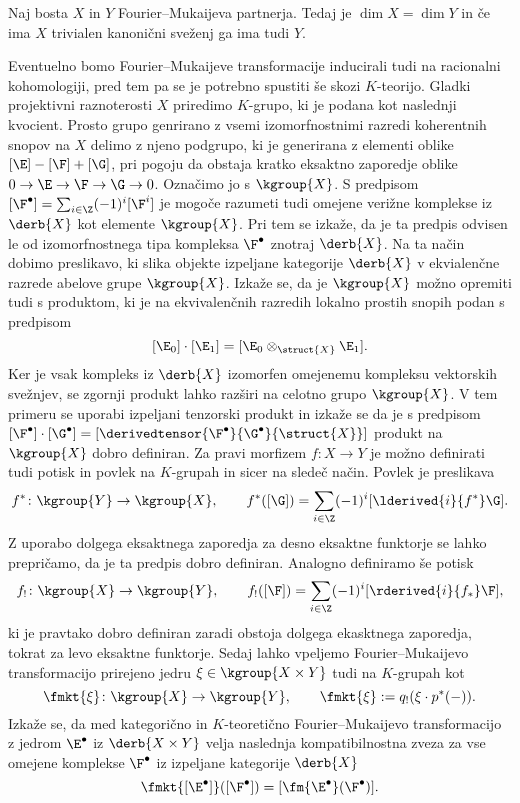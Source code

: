 \begin{izrek}
    Naj bosta $X$ in $Y$ Fourier--Mukaijeva partnerja. Tedaj je $\dim X = \dim Y$ in če ima $X$ trivialen kanonični sveženj ga ima tudi $Y$. 
\end{izrek}

Eventuelno bomo Fourier--Mukaijeve transformacije inducirali tudi na racionalni kohomologiji, pred tem pa se je potrebno spustiti še skozi $K$-teorijo. Gladki projektivni raznoterosti $X$ priredimo $K$-grupo, ki je podana kot naslednji kvocient. Prosto grupo genrirano z vsemi izomorfnostnimi razredi koherentnih snopov na $X$ delimo z njeno podgrupo, ki je generirana z elementi oblike $[\E] - [\F] + [\G]$, pri pogoju da obstaja kratko eksaktno zaporedje oblike $0 \to \E \to \F \to \G \to 0$. Označimo jo s $\kgroup{X}$. S predpisom $[\F^\bullet] = \sum_{i \in \Z} (-1)^i[\F^i]$ je mogoče razumeti tudi omejene verižne komplekse iz $\derb{X}$ kot elemente $\kgroup{X}$. Pri tem se izkaže, da je ta predpis odvisen le od izomorfnostnega tipa kompleksa $\F^\bullet$ znotraj $\derb{X}$. Na ta način dobimo preslikavo, ki slika objekte izpeljane kategorije $\derb{X}$ v ekvialenčne razrede abelove grupe $\kgroup{X}$. Izkaže se, da je $\kgroup{X}$ možno opremiti tudi s produktom, ki je na ekvivalenčnih razredih lokalno prostih snopih podan s predpisom 
\[
    [\E_0] \cdot [\E_1] = [\E_0 \otimes_{\struct{X}} \E_1].
\]
Ker je vsak kompleks iz $\derb{X}$ izomorfen omejenemu kompleksu vektorskih svežnjev, se zgornji produkt lahko razširi na celotno grupo $\kgroup{X}$. V tem primeru se uporabi izpeljani tenzorski produkt in izkaže se da je s predpisom $[\F^\bullet]\cdot [\G^\bullet] = [\derivedtensor{\F^\bullet}{\G^\bullet}{\struct{X}}]$ produkt na $\kgroup{X}$ dobro definiran. 
Za pravi morfizem $f \colon X \to Y$ je možno definirati tudi potisk in povlek na $K$-grupah in sicer na sledeč način. 
Povlek je preslikava
\[
    f^* \colon \kgroup{Y} \to \kgroup{X}, \qquad f^*([\G]) = \sum_{i \in \Z}(-1)^i[\lderived{i}{f^*}\G].
\]
Z uporabo dolgega eksaktnega zaporedja za desno eksaktne funktorje se lahko prepričamo, da je ta predpis dobro definiran. Analogno definiramo še potisk
\[
    f_! \colon \kgroup{X} \to \kgroup{Y}, \qquad f_!([\F]) = \sum_{i \in \Z}(-1)^i[\rderived{i}{f_*}\F],
\]
ki je pravtako dobro definiran zaradi obstoja dolgega ekasktnega zaporedja, tokrat za levo eksaktne funktorje. Sedaj lahko vpeljemo Fourier--Mukaijevo transformacijo prirejeno jedru $\xi \in \kgroup{X \times Y}$ tudi na $K$-grupah kot
\[
    \fmkt{\xi} \colon \kgroup{X} \to \kgroup{Y}, \qquad \fmkt{\xi} := q_!(\xi \cdot p^*(-)).
\]
Izkaže se, da med kategorično in $K$-teoretično Fourier--Mukaijevo transformacijo z jedrom $\E^\bullet$ iz $\derb{X \times Y}$ velja naslednja kompatibilnostna zveza za vse omejene komplekse $\F^\bullet$ iz izpeljane kategorije $\derb{X}$
\[
    \fmkt{[\E^\bullet]}([\F^\bullet]) = [\fm{\E^\bullet}(\F^\bullet)].
\]

